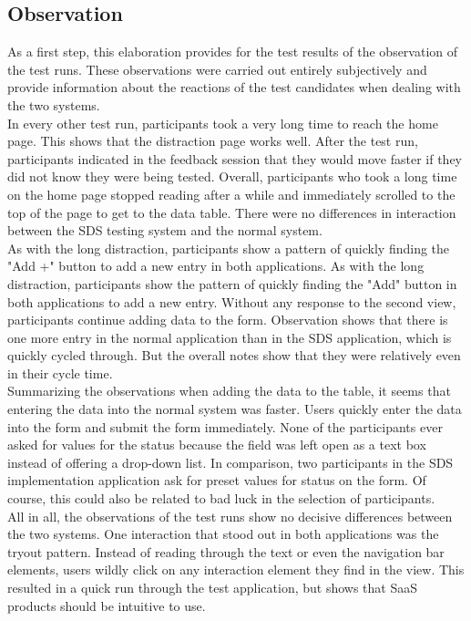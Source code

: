 \subsection{Observation}
As a first step, this elaboration provides for the test results of the observation of the test runs. These observations were carried out entirely subjectively and provide information about the reactions of the test candidates when dealing with the two systems. \\
In every other test run, participants took a very long time to reach the home page. This shows that the distraction page works well. After the test run, participants indicated in the feedback session that they would move faster if they did not know they were being tested. Overall, participants who took a long time on the home page stopped reading after a while and immediately scrolled to the top of the page to get to the data table. There were no differences in interaction between the SDS testing system and the normal system. \\
As with the long distraction, participants show a pattern of quickly finding the "Add +" button to add a new entry in both applications. As with the long distraction, participants show the pattern of quickly finding the "Add" button in both applications to add a new entry. Without any response to the second view, participants continue adding data to the form. Observation shows that there is one more entry in the normal application than in the \ac{SDS} application, which is quickly cycled through. But the overall notes show that they were relatively even in their cycle time. \\
Summarizing the observations when adding the data to the table, it seems that entering the data into the normal system was faster. Users quickly enter the data into the form and submit the form immediately. None of the participants ever asked for values for the status because the field was left open as a text box instead of offering a drop-down list. In comparison, two participants in the \ac{SDS} implementation application ask for preset values for status on the form. Of course, this could also be related to bad luck in the selection of participants. \\
All in all, the observations of the test runs show no decisive differences between the two systems. One interaction that stood out in both applications was the tryout pattern. Instead of reading through the text or even the navigation bar elements, users wildly click on any interaction element they find in the view. This resulted in a quick run through the test application, but shows that \ac{SaaS} products should be intuitive to use.

